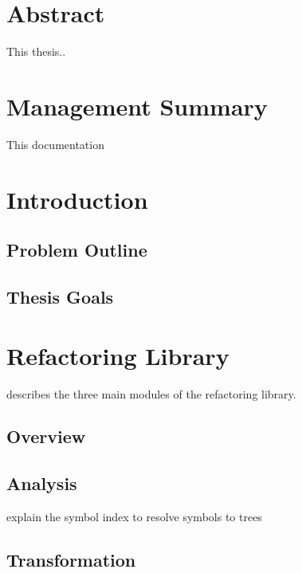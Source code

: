 \documentclass[10pt,a4paper,oneside]{scrreprt}
\begin{document}
\newcommand{\subtitlename}{Master's Thesis}
\newcommand{\titlename}{Refactoring for Scala}



\chapter*{Abstract}


This thesis..


\chapter*{Management Summary}

This documentation 

\newpage

\setcounter{tocdepth}{2}

\tableofcontents

\newpage


\chapter{Introduction}
\section{Problem Outline}
\section{Thesis Goals}

\chapter{Refactoring Library}

describes the three main modules of the refactoring library.

\section{Overview}
\section{Analysis}

explain the symbol index to resolve symbols to trees

\section{Transformation}
\end{document}
